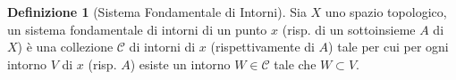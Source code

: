 \documentclass[10pt,a4paper]{article}
\theoremstyle{definition}
\newtheorem{defi}{Definizione}
\theoremstyle{plain}
\theoremstyle{remark}
\theoremstyle{remark}
\begin{document}



\begin{defi}[Sistema Fondamentale di Intorni] Sia $X$ uno spazio topologico, un
sistema fondamentale di intorni di un punto $x$ (risp. di un sottoinsieme $A$ di
$X$) è una collezione $\mathcal{C}$ di intorni di $x$ (rispettivamente di $A$)
tale per cui per ogni intorno $V$ di $x$ (risp. $A$) esiste un intorno $W \in
\mathcal{C}$ tale che $W \subset V$.
\end{defi}
\end{document}

